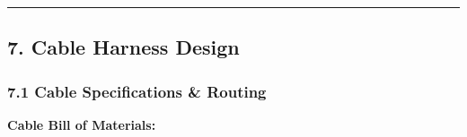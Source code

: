 \documentclass[
]{article}
\begin{document}
\begin{center}\rule{0.5\linewidth}{0.5pt}\end{center}

\hypertarget{cable-harness-design}{%
\subsection{7. Cable Harness Design}\label{cable-harness-design}}

\hypertarget{cable-specifications-routing}{%
\subsubsection{7.1 Cable Specifications \&
Routing}\label{cable-specifications-routing}}

\textbf{Cable Bill of Materials:}
\end{document}
